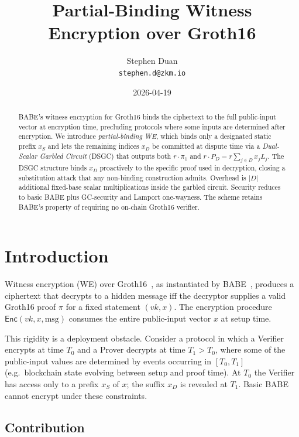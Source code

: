 \documentclass[11pt]{article}
\title{Partial-Binding Witness Encryption over Groth16}
\author{Stephen Duan\\\texttt{stephen.d@zkm.io}}
\date{2026-04-19}
\newcommand{\msg}{\mathrm{msg}}
\newcommand{\Enc}{\mathsf{Enc}}
\begin{document}
\maketitle

\begin{abstract}
BABE's witness encryption for Groth16 binds the ciphertext to the
full public-input vector at encryption time, precluding protocols
where some inputs are determined after encryption. We introduce
\emph{partial-binding WE}, which binds only a designated static
prefix $x_S$ and lets the remaining indices $x_D$ be committed at
dispute time via a \emph{Dual-Scalar Garbled Circuit} (DSGC) that
outputs both $r \cdot \pi_1$ and $r \cdot P_D = r \sum_{j \in D} x_j L_j$.
The DSGC structure binds $x_D$ proactively to the specific proof
used in decryption, closing a substitution attack that any
non-binding construction admits. Overhead is $|D|$ additional
fixed-base scalar multiplications inside the garbled circuit.
Security reduces to basic BABE plus GC-security and Lamport
one-wayness. The scheme retains BABE's property of requiring no
on-chain Groth16 verifier.
\end{abstract}

\section{Introduction}

Witness encryption (WE) over Groth16~\cite{groth16}, as instantiated
by BABE~\cite{babe2026}, produces a ciphertext that decrypts to a
hidden message iff the decryptor supplies a valid Groth16 proof
$\pi$ for a fixed statement $(vk, x)$. The encryption procedure
$\Enc(vk, x, \msg)$ consumes the entire public-input vector $x$ at
setup time.

This rigidity is a deployment obstacle. Consider a protocol in which
a Verifier encrypts at time $T_0$ and a Prover decrypts at time
$T_1 > T_0$, where some of the public-input values are determined by
events occurring in $[T_0, T_1]$ (e.g.\ blockchain state evolving
between setup and proof time). At $T_0$ the Verifier has access only
to a prefix $x_S$ of $x$; the suffix $x_D$ is revealed at $T_1$.
Basic BABE cannot encrypt under these constraints.

\subsection{Contribution}
\end{document}
